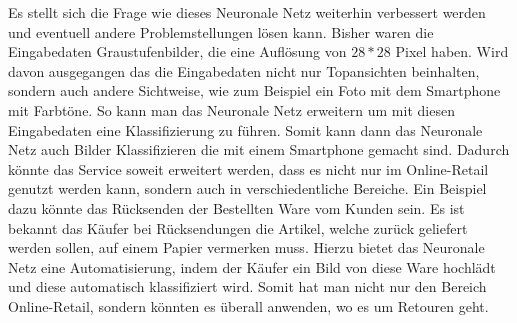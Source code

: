 \documentclass[12pt]{scrreprt}
\begin{document}
Es stellt sich die Frage wie dieses Neuronale Netz weiterhin verbessert werden und eventuell andere Problemstellungen lösen kann. Bisher waren die Eingabedaten Graustufenbilder, die eine Auflösung von $28*28$ Pixel haben. Wird davon ausgegangen das die Eingabedaten nicht nur Topansichten beinhalten, sondern auch andere Sichtweise, wie zum Beispiel ein Foto mit dem Smartphone mit Farbtöne. So kann man das Neuronale Netz erweitern um mit diesen Eingabedaten eine Klassifizierung zu führen. Somit kann dann das Neuronale Netz auch Bilder Klassifizieren die mit einem Smartphone gemacht sind. Dadurch könnte das Service soweit erweitert werden, dass es nicht nur im Online-Retail genutzt werden kann, sondern auch in verschiedentliche Bereiche. Ein Beispiel dazu könnte das Rücksenden der Bestellten Ware vom Kunden sein. Es ist bekannt das Käufer bei Rücksendungen die Artikel, welche zurück geliefert werden sollen, auf einem Papier vermerken muss. Hierzu bietet das Neuronale Netz eine Automatisierung, indem der Käufer ein Bild von diese Ware hochlädt und diese automatisch klassifiziert wird. Somit hat man nicht nur den Bereich Online-Retail, sondern könnten es überall anwenden, wo es um Retouren geht.
\cleardoubleoddpage




\cleardoublepage
	
\end{document}
